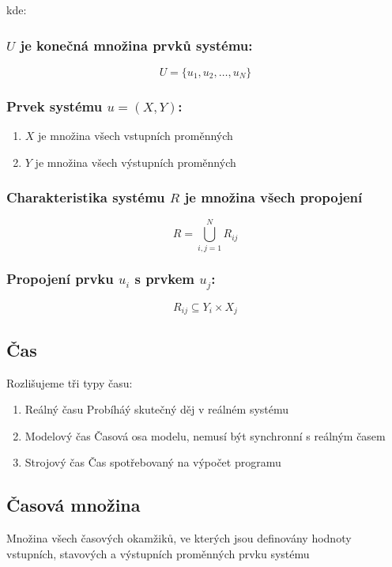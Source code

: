 \documentclass[11pt]{article}
\begin{document}
kde:
\subsubsection{\(U\) je konečná množina prvků systému:}
\label{sec:orga1e0e41}
\[U = \{u_1, u_2, \dots, u_N\}\]

\subsubsection{Prvek systému \(u = (X, Y)\):}
\label{sec:org913f7b5}
\begin{enumerate}
\item \(X\) je množina všech vstupních proměnných
\label{sec:org2e06c6d}
\item \(Y\) je množina všech výstupních proměnných
\label{sec:org784c23c}
\end{enumerate}

\subsubsection{Charakteristika systému \(R\) je množina všech propojení}
\label{sec:org39f3d77}
\[R = \bigcup^{N}_{i,j=1} R_{ij}\]

\subsubsection{Propojení prvku \(u_i\) s prvkem \(u_j\):}
\label{sec:org23b5178}
\[R_{ij} \subseteq Y_i \times X_j\]

\subsection{Čas}
\label{sec:org8edafa0}
Rozlišujeme tři typy času:
\begin{enumerate}
\item Reálný času
Probíháý skutečný děj v reálném systému
\item Modelový čas
Časová osa modelu, nemusí být synchronní s reálným časem
\item Strojový čas
Čas spotřebovaný na výpočet programu
\end{enumerate}

\subsection{Časová množina}
\label{sec:org97e4b41}
Množina všech časových okamžiků, ve kterých jsou definovány hodnoty vstupních,
stavových a výstupních proměnných prvku systému
\end{document}
